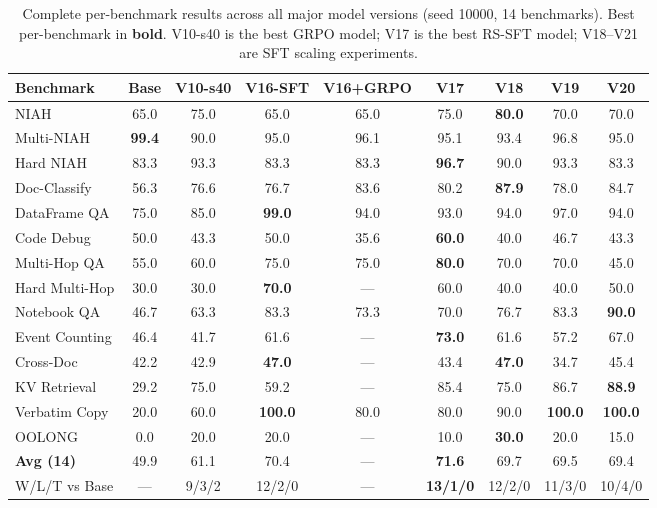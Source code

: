 \documentclass{article}
\begin{document}
\begin{table}[t]
\caption{Complete per-benchmark results across all major model versions (seed 10000, 14 benchmarks). Best per-benchmark in \textbf{bold}. V10-s40 is the best GRPO model; V17 is the best RS-SFT model; V18--V21 are SFT scaling experiments.}
\label{tab:full-versions}
\vskip 0.15in
\begin{center}
\begin{footnotesize}
\begin{tabular}{lcccccccc}
\toprule
Benchmark & Base & V10-s40 & V16-SFT & V16+GRPO & V17 & V18 & V19 & V20 \\
\midrule
NIAH & 65.0 & 75.0 & 65.0 & 65.0 & 75.0 & \textbf{80.0} & 70.0 & 70.0 \\
Multi-NIAH & \textbf{99.4} & 90.0 & 95.0 & 96.1 & 95.1 & 93.4 & 96.8 & 95.0 \\
Hard NIAH & 83.3 & 93.3 & 83.3 & 83.3 & \textbf{96.7} & 90.0 & 93.3 & 83.3 \\
Doc-Classify & 56.3 & 76.6 & 76.7 & 83.6 & 80.2 & \textbf{87.9} & 78.0 & 84.7 \\
DataFrame QA & 75.0 & 85.0 & \textbf{99.0} & 94.0 & 93.0 & 94.0 & 97.0 & 94.0 \\
Code Debug & 50.0 & 43.3 & 50.0 & 35.6 & \textbf{60.0} & 40.0 & 46.7 & 43.3 \\
Multi-Hop QA & 55.0 & 60.0 & 75.0 & 75.0 & \textbf{80.0} & 70.0 & 70.0 & 45.0 \\
Hard Multi-Hop & 30.0 & 30.0 & \textbf{70.0} & --- & 60.0 & 40.0 & 40.0 & 50.0 \\
Notebook QA & 46.7 & 63.3 & 83.3 & 73.3 & 70.0 & 76.7 & 83.3 & \textbf{90.0} \\
Event Counting & 46.4 & 41.7 & 61.6 & --- & \textbf{73.0} & 61.6 & 57.2 & 67.0 \\
Cross-Doc & 42.2 & 42.9 & \textbf{47.0} & --- & 43.4 & \textbf{47.0} & 34.7 & 45.4 \\
KV Retrieval & 29.2 & 75.0 & 59.2 & --- & 85.4 & 75.0 & 86.7 & \textbf{88.9} \\
Verbatim Copy & 20.0 & 60.0 & \textbf{100.0} & 80.0 & 80.0 & 90.0 & \textbf{100.0} & \textbf{100.0} \\
OOLONG & 0.0 & 20.0 & 20.0 & --- & 10.0 & \textbf{30.0} & 20.0 & 15.0 \\
\midrule
\textbf{Avg (14)} & 49.9 & 61.1 & 70.4 & --- & \textbf{71.6} & 69.7 & 69.5 & 69.4 \\
W/L/T vs Base & --- & 9/3/2 & 12/2/0 & --- & \textbf{13/1/0} & 12/2/0 & 11/3/0 & 10/4/0 \\
\bottomrule
\end{tabular}
\end{footnotesize}
\end{center}
\vskip -0.15in
\end{table}
\end{document}
